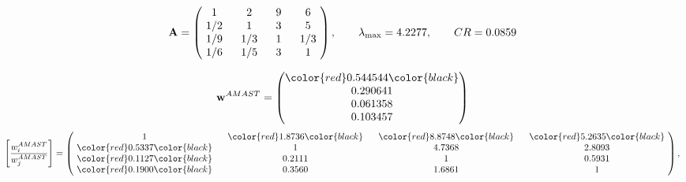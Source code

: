 \begin{example}
\begin{equation*}
\mathbf{A} =
\begin{pmatrix}
$\,\,$ 1 $\,\,$ & $\,\,$2$\,\,$ & $\,\,$9$\,\,$ & $\,\,$6 $\,\,$ \\
$\,\,$ 1/2$\,\,$ & $\,\,$ 1 $\,\,$ & $\,\,$3$\,\,$ & $\,\,$5 $\,\,$ \\
$\,\,$ 1/9$\,\,$ & $\,\,$ 1/3$\,\,$ & $\,\,$ 1 $\,\,$ & $\,\,$ 1/3 $\,\,$ \\
$\,\,$ 1/6$\,\,$ & $\,\,$ 1/5$\,\,$ & $\,\,$3$\,\,$ & $\,\,$ 1  $\,\,$ \\
\end{pmatrix},
\qquad
\lambda_{\max} =
4.2277,
\qquad
CR = 0.0859
\end{equation*}

\begin{equation*}
\mathbf{w}^{AMAST} =
\begin{pmatrix}
\color{red} 0.544544\color{black} \\
0.290641\\
0.061358\\
0.103457
\end{pmatrix}\end{equation*}
\begin{equation*}
\left[ \frac{{w}^{AMAST}_i}{{w}^{AMAST}_j} \right] =
\begin{pmatrix}
$\,\,$ 1 $\,\,$ & $\,\,$\color{red} 1.8736\color{black} $\,\,$ & $\,\,$\color{red} 8.8748\color{black} $\,\,$ & $\,\,$\color{red} 5.2635\color{black} $\,\,$ \\
$\,\,$\color{red} 0.5337\color{black} $\,\,$ & $\,\,$ 1 $\,\,$ & $\,\,$4.7368$\,\,$ & $\,\,$2.8093  $\,\,$ \\
$\,\,$\color{red} 0.1127\color{black} $\,\,$ & $\,\,$0.2111$\,\,$ & $\,\,$ 1 $\,\,$ & $\,\,$0.5931 $\,\,$ \\
$\,\,$\color{red} 0.1900\color{black} $\,\,$ & $\,\,$0.3560$\,\,$ & $\,\,$1.6861$\,\,$ & $\,\,$ 1  $\,\,$ \\
\end{pmatrix},
\end{equation*}


\end{example}
